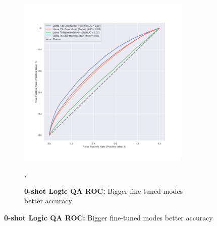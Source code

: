 \documentclass[11pt]{article}
\begin{document}
\begin{figure}
\begin{subfigure}[b]{0.38\textwidth}
         \centering \includegraphics[width=0.9\textwidth]{figures/0-shot-logic-qa-roc.png}
         \caption{\textbf{0-shot Logic QA ROC:} Bigger fine-tuned modes better accuracy},
         \label{fig:0-shot-MMLU}
    \end{subfigure}  
    

\end{figure}
\end{document}
